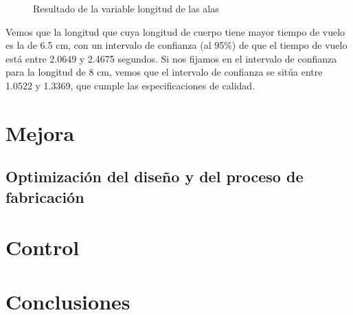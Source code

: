 \documentclass[12pt,a4paper,twoside,openright,titlepage,final]{article}
\begin{document}
\begin{figure}[htbp!]
	\centering
	\caption{Resultado de la variable longitud de las alas} \label{fig:resultado_largo_cuerpo}
\end{figure}

Vemos que la longitud que cuya longitud de cuerpo tiene mayor tiempo de vuelo es la de 6.5 cm, con un intervalo de confianza (al 95\%) de que el tiempo de vuelo está entre 2.0649 y 2.4675 segundos. Si nos fijamos en el intervalo de confianza para la longitud de 8 cm, vemos que el intervalo de confianza se sitúa entre 1.0522 y 1.3369, que cumple las especificaciones de calidad.

\section{Mejora}

\subsection{Optimización del diseño y del proceso de fabricación}

\section{Control}

\section{Conclusiones}
\end{document}
